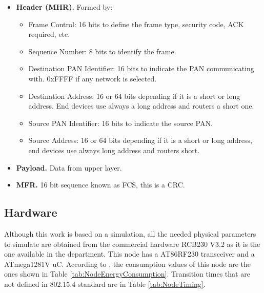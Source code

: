 \begin{itemize}
 \item \textbf{Header (\ac{MHR}).} Formed by:
  \begin{itemize}
   \item Frame Control: 16 bits to define the frame type, security code, \ac{ACK} required, etc.
   \item Sequence Number: 8 bits to identify the frame.
   \item Destination \ac{PAN} Identifier: 16 bits to indicate the \ac{PAN} communicating with. 0xFFFF if any network is selected.
   \item Destination Address: 16 or 64 bits depending if it is a short or long address. End devices use always a long address and routers a short one.
   \item Source PAN Identifier: 16 bits to indicate the source \ac{PAN}.
   \item Source Address: 16 or 64 bits depending if it is a short or long address, end devices use always long address and routers short.
  \end{itemize}
 \item \textbf{Payload.} Data from upper layer.
 \item \textbf{\ac{MFR}.} 16 bit sequence known as \ac{FCS}, this is a \ac{CRC}.
\end{itemize}

\subsection{Hardware}

Although this work is based on a simulation, all the needed physical parameters to simulate are obtained from the commercial hardware 
RCB230 V3.2 as it is the one available in the department. This node has a AT86RF230 transceiver and a ATmega1281V \ac{uC}. According 
to \cite{LPLandOLP}, the consumption values of this node are the ones shown in Table \ref{tab:NodeEnergyConsumption}. Transition times that are not defined
in 802.15.4 standard are in Table \ref{tab:NodeTiming}.


